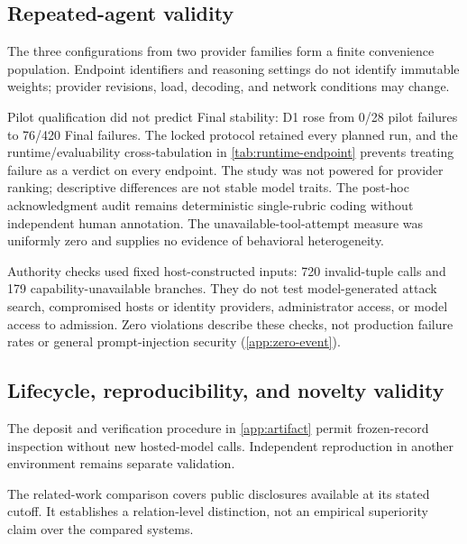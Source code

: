 \subsection{Repeated-agent validity}

The three configurations from two provider families form a finite convenience population. Endpoint identifiers and reasoning settings do not identify immutable weights; provider revisions, load, decoding, and network conditions may change.

Pilot qualification did not predict Final stability: D1 rose from 0/28 pilot failures to 76/420 Final failures. The locked protocol retained every planned run, and the runtime/evaluability cross-tabulation in \cref{tab:runtime-endpoint} prevents treating failure as a verdict on every endpoint. The study was not powered for provider ranking; descriptive differences are not stable model traits. The post-hoc acknowledgment audit remains deterministic single-rubric coding without independent human annotation. The unavailable-tool-attempt measure was uniformly zero and supplies no evidence of behavioral heterogeneity.

Authority checks used fixed host-constructed inputs: 720 invalid-tuple calls and 179 capability-unavailable branches. They do not test model-generated attack search, compromised hosts or identity providers, administrator access, or model access to admission. Zero violations describe these checks, not production failure rates or general prompt-injection security (\cref{app:zero-event}).

\subsection{Lifecycle, reproducibility, and novelty validity}

The deposit and verification procedure in \cref{app:artifact} permit frozen-record inspection without new hosted-model calls. Independent reproduction in another environment remains separate validation.

The related-work comparison covers public disclosures available at its stated cutoff. It establishes a relation-level distinction, not an empirical superiority claim over the compared systems.

